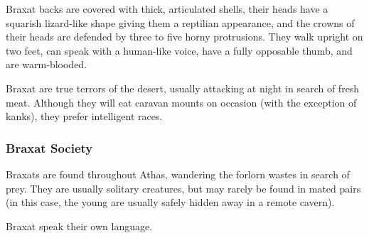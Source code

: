 
Braxat backs are covered with thick, articulated shells, their heads have a squarish lizard-like shape giving them a reptilian appearance, and the crowns of their heads are defended by three to five horny protrusions. They walk upright on two feet, can speak with a human-like voice, have a fully opposable thumb, and are warm-blooded.

Braxat are true terrors of the desert, usually attacking at night in search of fresh meat. Although they will eat caravan mounts on occasion (with the exception of kanks), they prefer intelligent races.

\subsubsection{Braxat Society}
Braxats are found throughout Athas, wandering the forlorn wastes in search of prey. They are usually solitary creatures, but may rarely be found in mated pairs (in this case, the young are usually safely hidden away in a remote cavern).

Braxat speak their own language.


